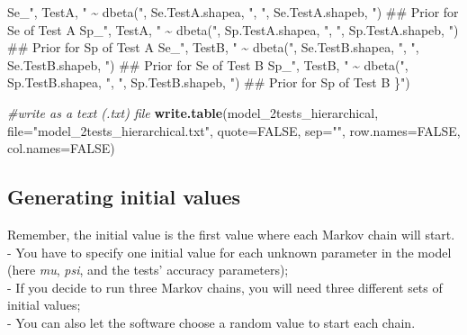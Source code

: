 \documentclass[
]{book}
\newenvironment{Shaded}{\begin{snugshade}}{\end{snugshade}}
\newcommand{\AttributeTok}[1]{\textcolor[rgb]{0.13,0.29,0.53}{#1}}
\newcommand{\CommentTok}[1]{\textcolor[rgb]{0.56,0.35,0.01}{\textit{#1}}}
\newcommand{\ConstantTok}[1]{\textcolor[rgb]{0.56,0.35,0.01}{#1}}
\newcommand{\FunctionTok}[1]{\textcolor[rgb]{0.13,0.29,0.53}{\textbf{#1}}}
\newcommand{\NormalTok}[1]{#1}
\newcommand{\StringTok}[1]{\textcolor[rgb]{0.31,0.60,0.02}{#1}}
\begin{document}
\begin{Shaded}
\begin{Highlighting}[]
\StringTok{  Se\_"}\NormalTok{, TestA, }\StringTok{" \textasciitilde{} dbeta("}\NormalTok{, Se.TestA.shapea, }\StringTok{", "}\NormalTok{, Se.TestA.shapeb, }\StringTok{")  \#\# Prior for Se of Test A}
\StringTok{  Sp\_"}\NormalTok{, TestA, }\StringTok{" \textasciitilde{} dbeta("}\NormalTok{, Sp.TestA.shapea, }\StringTok{", "}\NormalTok{, Sp.TestA.shapeb, }\StringTok{")  \#\# Prior for Sp of Test A}
\StringTok{  Se\_"}\NormalTok{, TestB, }\StringTok{" \textasciitilde{} dbeta("}\NormalTok{, Se.TestB.shapea, }\StringTok{", "}\NormalTok{, Se.TestB.shapeb, }\StringTok{")  \#\# Prior for Se of Test B}
\StringTok{  Sp\_"}\NormalTok{, TestB, }\StringTok{" \textasciitilde{} dbeta("}\NormalTok{, Sp.TestB.shapea, }\StringTok{", "}\NormalTok{, Sp.TestB.shapeb, }\StringTok{")  \#\# Prior for Sp of Test B}
\StringTok{ }
\StringTok{\}"}\NormalTok{)}


\CommentTok{\#write as a text (.txt) file}
\FunctionTok{write.table}\NormalTok{(model\_2tests\_hierarchical, }
            \AttributeTok{file=}\StringTok{"model\_2tests\_hierarchical.txt"}\NormalTok{, }
            \AttributeTok{quote=}\ConstantTok{FALSE}\NormalTok{, }
            \AttributeTok{sep=}\StringTok{""}\NormalTok{, }
            \AttributeTok{row.names=}\ConstantTok{FALSE}\NormalTok{,}
            \AttributeTok{col.names=}\ConstantTok{FALSE}\NormalTok{)}
\end{Highlighting}
\end{Shaded}

\subsection{Generating initial values}\label{generating-initial-values-1}

Remember, the initial value is the first value where each Markov chain will start.\\
- You have to specify one initial value for each unknown parameter in the model (here \emph{mu}, \emph{psi}, and the tests' accuracy parameters);\\
- If you decide to run three Markov chains, you will need three different sets of initial values;\\
- You can also let the software choose a random value to start each chain.
\end{document}
